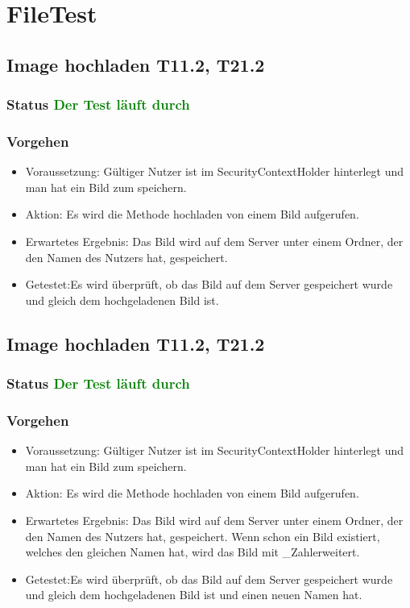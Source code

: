 \section{FileTest}
\subsection{Image hochladen T11.2, T21.2}
\subsubsection{Status \textcolor{green}{ Der Test läuft durch} }
\subsubsection{Vorgehen}
\begin{itemize}
	\item Voraussetzung: Gültiger Nutzer ist im SecurityContextHolder hinterlegt und man hat ein Bild zum speichern.
	\item Aktion: Es wird die Methode hochladen von einem Bild aufgerufen. 
	\item Erwartetes Ergebnis: Das Bild wird auf dem Server unter einem Ordner, der den Namen des Nutzers hat, gespeichert.
	\item Getestet:Es wird überprüft, ob das Bild auf dem Server gespeichert wurde und gleich dem hochgeladenen Bild ist.
\end{itemize}

\subsection{Image hochladen T11.2, T21.2}
\subsubsection{Status \textcolor{green}{ Der Test läuft durch} }
\subsubsection{Vorgehen}
\begin{itemize}
	\item Voraussetzung: Gültiger Nutzer ist im SecurityContextHolder hinterlegt und man hat ein Bild zum speichern.
	\item Aktion: Es wird die Methode hochladen von einem Bild aufgerufen. 
	\item Erwartetes Ergebnis: Das Bild wird auf dem Server unter einem Ordner, der den Namen des Nutzers hat, gespeichert. Wenn schon ein Bild existiert, welches den gleichen Namen hat, wird das Bild mit \dq\_Zahl\dq  erweitert.
	\item Getestet:Es wird überprüft, ob das Bild auf dem Server gespeichert wurde und gleich dem hochgeladenen Bild ist und einen neuen Namen hat.
\end{itemize}

